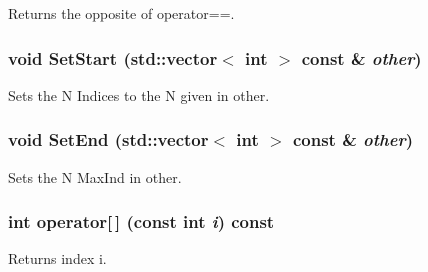 Returns the opposite of operator==. \hypertarget{classJKBuilder_1_1Iterator_aa83de505e29125c1d3ac7bb1b13ca15a}{
\subsubsection[{SetStart}]{\setlength{\rightskip}{0pt plus 5cm}void SetStart (std::vector$<$ int $>$ const \& {\em other})}}
\label{classJKBuilder_1_1Iterator_aa83de505e29125c1d3ac7bb1b13ca15a}


Sets the N Indices to the N given in other. \hypertarget{classJKBuilder_1_1Iterator_aad84ec668b5f41210db34c540aaa31fc}{
\subsubsection[{SetEnd}]{\setlength{\rightskip}{0pt plus 5cm}void SetEnd (std::vector$<$ int $>$ const \& {\em other})}}
\label{classJKBuilder_1_1Iterator_aad84ec668b5f41210db34c540aaa31fc}


Sets the N MaxInd in other. \hypertarget{classJKBuilder_1_1Iterator_a74247cf730a06b23fcb1ec64e5596b25}{
\subsubsection[{operator[]}]{\setlength{\rightskip}{0pt plus 5cm}int operator\mbox{[}$\,$\mbox{]} (const int {\em i}) const}}
\label{classJKBuilder_1_1Iterator_a74247cf730a06b23fcb1ec64e5596b25}


Returns index i. 

